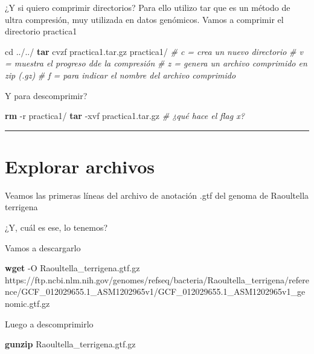\documentclass[
]{book}
\newenvironment{Shaded}{\begin{snugshade}}{\end{snugshade}}
\newcommand{\AttributeTok}[1]{\textcolor[rgb]{0.13,0.29,0.53}{#1}}
\newcommand{\BuiltInTok}[1]{#1}
\newcommand{\CommentTok}[1]{\textcolor[rgb]{0.56,0.35,0.01}{\textit{#1}}}
\newcommand{\ExtensionTok}[1]{#1}
\newcommand{\FunctionTok}[1]{\textcolor[rgb]{0.13,0.29,0.53}{\textbf{#1}}}
\newcommand{\NormalTok}[1]{#1}
\begin{document}
¿Y si quiero comprimir directorios? Para ello utilizo tar que es un método de ultra
compresión, muy utilizada en datos genómicos. Vamos a comprimir el directorio practica1

\begin{Shaded}
\begin{Highlighting}[]
\BuiltInTok{cd}\NormalTok{ ../../}
\FunctionTok{tar}\NormalTok{ cvzf practica1.tar.gz practica1/}
\CommentTok{\# c = crea un nuevo directorio}
\CommentTok{\# v = muestra el progreso dde la compresión}
\CommentTok{\# z = genera un archivo comprimido en zip (.gz)}
\CommentTok{\# f = para indicar el nombre del archivo comprimido}
\end{Highlighting}
\end{Shaded}

Y para descomprimir?

\begin{Shaded}
\begin{Highlighting}[]
\FunctionTok{rm} \AttributeTok{{-}r}\NormalTok{ practica1/}
\FunctionTok{tar} \AttributeTok{{-}xvf}\NormalTok{ practica1.tar.gz}
\CommentTok{\# ¿qué hace el flag x?}
\end{Highlighting}
\end{Shaded}

\begin{center}\rule{0.5\linewidth}{0.5pt}\end{center}

\section{Explorar archivos}\label{explorar-archivos}

Veamos las primeras líneas del archivo de anotación .gtf del genoma de Raoultella terrigena

¿Y, cuál es ese, lo tenemos?

Vamos a descargarlo

\begin{Shaded}
\begin{Highlighting}[]
\FunctionTok{wget} \AttributeTok{{-}O}\NormalTok{ Raoultella\_terrigena.gtf.gz}
\ExtensionTok{https://ftp.ncbi.nlm.nih.gov/genomes/refseq/bacteria/Raoultella\_terrigena/reference/GCF\_012029655.1\_ASM1202965v1/GCF\_012029655.1\_ASM1202965v1\_genomic.gtf.gz}
\end{Highlighting}
\end{Shaded}

Luego a descomprimirlo

\begin{Shaded}
\begin{Highlighting}[]
\FunctionTok{gunzip}\NormalTok{ Raoultella\_terrigena.gtf.gz}
\end{Highlighting}
\end{Shaded}
\end{document}
